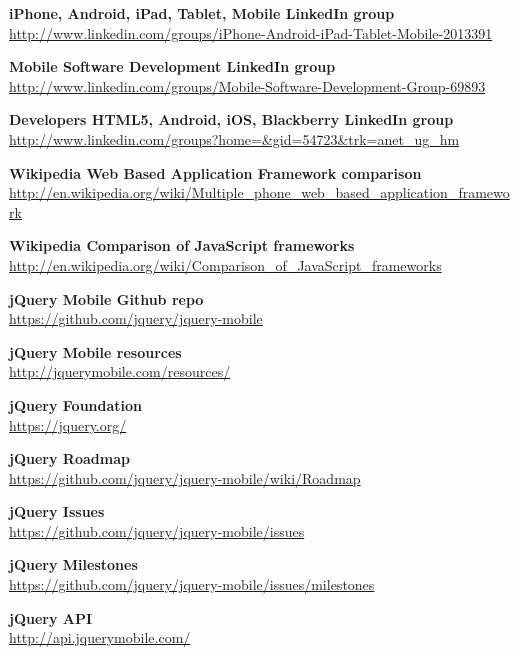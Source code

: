 \documentclass[a4paper,12pt]{book}
\begin{document}
\begin{thebibliography}{25}
\textbf{iPhone, Android, iPad, Tablet, Mobile LinkedIn group}\\
{\footnotesize\url{http://www.linkedin.com/groups/iPhone-Android-iPad-Tablet-Mobile-2013391}}

\textbf{Mobile Software Development LinkedIn group}\\
{\footnotesize\url{http://www.linkedin.com/groups/Mobile-Software-Development-Group-69893}}

\textbf{Developers HTML5, Android, iOS, Blackberry LinkedIn group}\\
{\footnotesize\url{http://www.linkedin.com/groups?home=&gid=54723&trk=anet_ug_hm}}

\textbf{Wikipedia Web Based Application Framework comparison}\\
{\footnotesize\url{http://en.wikipedia.org/wiki/Multiple_phone_web_based_application_framework}}

\textbf{Wikipedia Comparison of JavaScript frameworks}\\
{\footnotesize\url{http://en.wikipedia.org/wiki/Comparison_of_JavaScript_frameworks}}

\textbf{jQuery Mobile Github repo}\\
{\footnotesize\url{https://github.com/jquery/jquery-mobile}}

\textbf{jQuery Mobile resources}\\
{\footnotesize\url{http://jquerymobile.com/resources/}}

\textbf{jQuery Foundation}\\
{\footnotesize\url{https://jquery.org/}}

\textbf{jQuery Roadmap}\\
{\footnotesize\url{https://github.com/jquery/jquery-mobile/wiki/Roadmap}}

\textbf{jQuery Issues}\\
{\footnotesize\url{https://github.com/jquery/jquery-mobile/issues}}

\textbf{jQuery Milestones}\\
{\footnotesize\url{https://github.com/jquery/jquery-mobile/issues/milestones}}

\textbf{jQuery API}\\
{\footnotesize\url{http://api.jquerymobile.com/}}


\end{thebibliography}
\end{document}
